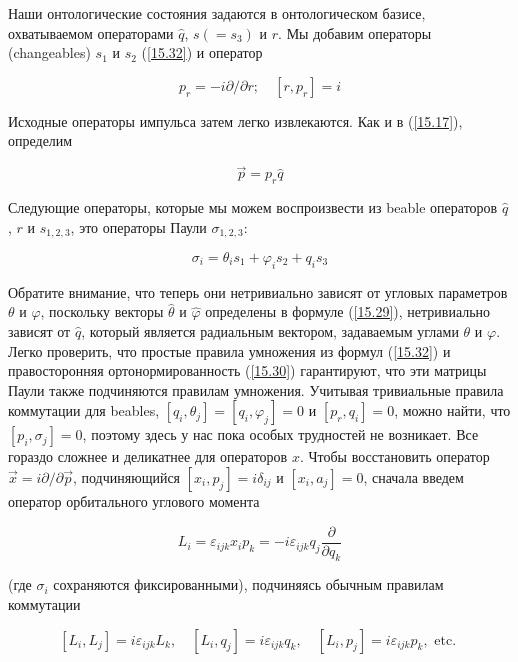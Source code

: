 \documentclass[main.tex]{subfiles}
\begin{document}
Наши онтологические состояния задаются в онтологическом базисе, охватываемом операторами $\hat q$, $s (= s_3)$ и $r$. Мы добавим операторы (changeables) $s_1$ и $s_2$ (\ref{15.32}) и оператор

\begin{equation}\label{15.41}
	p_{r}=-i \partial / \partial r ; \quad\left[r, p_{r}\right]=i
\end{equation}

Исходные операторы импульса затем легко извлекаются. Как и в (\ref{15.17}), определим

\begin{equation}\label{15.42}
	\vec p = p_r \hat q
\end{equation}

Следующие операторы, которые мы можем воспроизвести из beable операторов $\hat q$, $r$ и $s_{1,2,3}$, это операторы Паули $\sigma_{1,2,3}$:

\begin{equation}\label{15.43}
	\sigma_{i}=\theta_{i} s_{1}+\varphi_{i} s_{2}+q_{i} s_{3}
\end{equation}

Обратите внимание, что теперь они нетривиально зависят от угловых параметров $\theta$ и $\varphi$, поскольку векторы $\hat\theta$ и $\hat\varphi$  определены в формуле (\ref{15.29}), нетривиально зависят от $\hat q$, который является радиальным вектором, задаваемым углами $\theta$ и $\varphi$. Легко проверить, что простые правила умножения из формул (\ref{15.32}) и правосторонняя ортонормированность (\ref{15.30}) гарантируют, что эти матрицы Паули также подчиняются правилам умножения. Учитывая тривиальные правила коммутации для beables, $[q_i, \theta_j] = [q_i, \varphi_j] = 0$ и $[p_r, q_i] = 0$, можно найти, что $[p_i, \sigma_j] = 0$, поэтому здесь у нас пока особых трудностей не возникает.
Все гораздо сложнее и деликатнее для операторов $x$. Чтобы восстановить оператор $\vec x = i\partial / \partial\vec p$, подчиняющийся $[x_i, p_j] = i\delta_{ij}$ и $[x_i, a_j] = 0$, сначала введем оператор орбитального углового момента

\begin{equation}\label{15.44}
	L_{i}=\varepsilon_{i j k} x_{i} p_{k}=-i \varepsilon_{i j k} q_{j} \frac{\partial}{\partial q_{k}}
\end{equation}

(где $\sigma_i$ сохраняются фиксированными), подчиняясь обычным правилам коммутации

\begin{equation}\label{15.45}
	\left[L_{i}, L_{j}\right]=i \varepsilon_{i j k} L_{k}, \quad\left[L_{i}, q_{j}\right]=i \varepsilon_{i j k} q_{k}, \quad\left[L_{i}, p_{j}\right]=i \varepsilon_{i j k} p_{k}, \text { etc. }
\end{equation}
\end{document}
